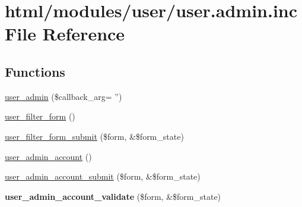 \hypertarget{user_8admin_8inc}{
\section{html/modules/user/user.admin.inc File Reference}
\label{user_8admin_8inc}
}
\subsection*{Functions}
\begin{DoxyCompactItemize}
\item 
\hyperlink{user_8admin_8inc_a16b515af1b1f5d114383d668812c0b9b}{user\_\-admin} (\$callback\_\-arg= '')
\item 
\hyperlink{group__forms_ga4492f8566743ff967248ff7d22108a54}{user\_\-filter\_\-form} ()
\item 
\hyperlink{user_8admin_8inc_aedf12621a6f405cf3032a9319771b4e1}{user\_\-filter\_\-form\_\-submit} (\$form, \&\$form\_\-state)
\item 
\hyperlink{group__forms_ga3dde5a35fbda589c3fb9a4bb6d4b1d9a}{user\_\-admin\_\-account} ()
\item 
\hyperlink{user_8admin_8inc_a20540c356ad435d034ff0229323f33d5}{user\_\-admin\_\-account\_\-submit} (\$form, \&\$form\_\-state)
\item 
\hypertarget{user_8admin_8inc_a677766378db180ef3601f618951f35e0}{
{\bfseries user\_\-admin\_\-account\_\-validate} (\$form, \&\$form\_\-state)}
\label{user_8admin_8inc_a677766378db180ef3601f618951f35e0}


\end{DoxyCompactItemize}
